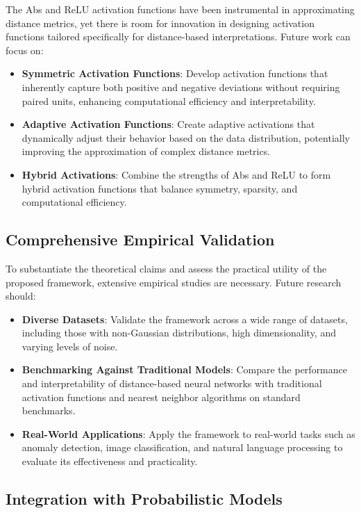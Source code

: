 The Abs and ReLU activation functions have been instrumental in approximating distance metrics, yet there is room for innovation in designing activation functions tailored specifically for distance-based interpretations. Future work can focus on:
\begin{itemize}
    \item \textbf{Symmetric Activation Functions}: Develop activation functions that inherently capture both positive and negative deviations without requiring paired units, enhancing computational efficiency and interpretability.
    \item \textbf{Adaptive Activation Functions}: Create adaptive activations that dynamically adjust their behavior based on the data distribution, potentially improving the approximation of complex distance metrics.
    \item \textbf{Hybrid Activations}: Combine the strengths of Abs and ReLU to form hybrid activation functions that balance symmetry, sparsity, and computational efficiency.
\end{itemize}

\subsection{Comprehensive Empirical Validation}

To substantiate the theoretical claims and assess the practical utility of the proposed framework, extensive empirical studies are necessary. Future research should:
\begin{itemize}
    \item \textbf{Diverse Datasets}: Validate the framework across a wide range of datasets, including those with non-Gaussian distributions, high dimensionality, and varying levels of noise.
    \item \textbf{Benchmarking Against Traditional Models}: Compare the performance and interpretability of distance-based neural networks with traditional activation functions and nearest neighbor algorithms on standard benchmarks.
    \item \textbf{Real-World Applications}: Apply the framework to real-world tasks such as anomaly detection, image classification, and natural language processing to evaluate its effectiveness and practicality.
\end{itemize}

\subsection{Integration with Probabilistic Models}

